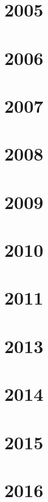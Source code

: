 \section{2005}



\section{2006}


\section{2007}

\section{2008}

\section{2009}


\section{2010}

\section{2011}



\section{2013}

\section{2014}

\section{2015}

\section{2016}



